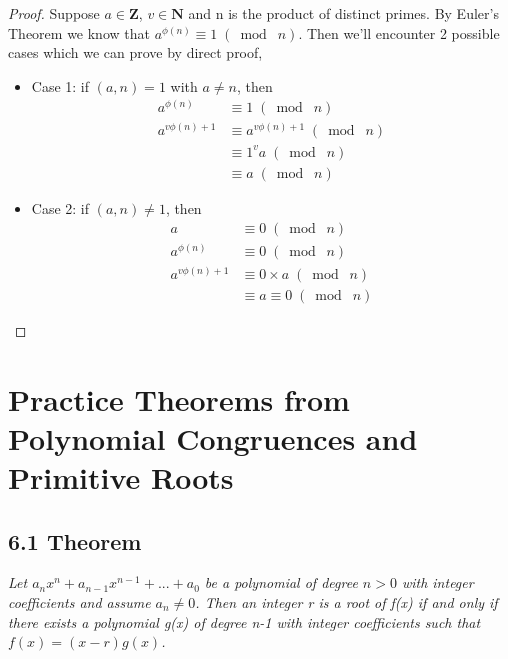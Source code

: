 \documentclass{article}
\begin{document}
\begin{proof}
Suppose $a \in \mathbf{Z}$, $v \in \mathbf{N}$ and n is the product of distinct primes. By Euler's Theorem we know that $a^{\phi(n)} \equiv 1 \;(\bmod\; n)$. Then we'll encounter 2 possible cases which we can prove by direct proof,
\begin{itemize}
    \item Case 1: if $(a,n) = 1$ with $a \neq n$, then\\
        \begin{align*}
            &&a^{\phi(n)} &\equiv 1 \;(\bmod\; n)&&\\
            &&a^{v\phi(n)+1} &\equiv a^{v\phi(n)+1} \;(\bmod\; n)&&\\
            && &\equiv 1^{v}a \;(\bmod\; n)&&\\
            && &\equiv a \;(\bmod\; n)&&
        \end{align*}
    \item Case 2: if $(a,n) \neq 1$, then\\
        \begin{align*}
            &&a &\equiv 0 \;(\bmod\; n)&&\\
            &&a^{\phi(n)} &\equiv 0 \;(\bmod\; n)&&\\
            &&a^{v\phi(n)+1} &\equiv 0\times a \;(\bmod\; n)&&\\
            && &\equiv a \equiv 0 \;(\bmod\; n)&&
        \end{align*}
\end{itemize}
\end{proof}
\section*{Practice Theorems from Polynomial Congruences and Primitive Roots}

\subsection*{6.1 Theorem} 
\quad \textit{Let $a_nx^n + a_{n-1}x^{n-1} + ... + a_0$ be a polynomial of degree $n > 0$ with integer coefficients and assume $a_n \neq 0$. Then an integer r is a root of f(x) if and only if there exists a polynomial g(x) of degree n-1 with integer coefficients such that $f(x) = (x-r)g(x)$.}
\end{document}
